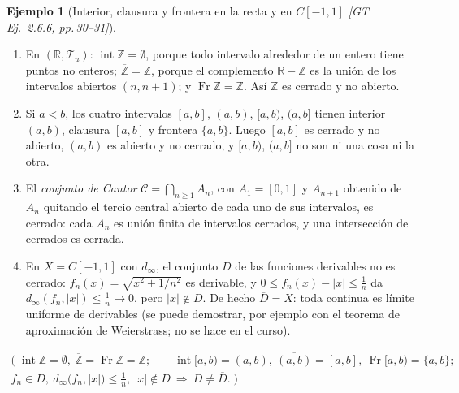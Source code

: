 \documentclass[11pt,a4paper]{article}
\newcommand{\lgc}[1]{\par\vspace{-3pt}\begin{gather*}\big(\;#1\;\big)\end{gather*}\vspace{-6pt}}
\newcommand{\figtit}[1]{\par\vspace{2pt}{\footnotesize\itshape #1}\par}
\theoremstyle{definition}
\newtheorem{ejemplo}[definicion]{Ejemplo}
\theoremstyle{plain}
\newcommand{\fnt}[1]{{\normalfont\small\itshape\color{gray!150!black}[#1]}}
\newcommand{\R}{\mathbb{R}}
\newcommand{\Z}{\mathbb{Z}}
\newcommand{\cl}[1]{\overline{#1}}
\newcommand{\intr}{\operatorname{int}}
\newcommand{\fr}{\operatorname{Fr}}
\newcommand{\tp}{\mathcal{T}}
\begin{document}
\begin{ejemplo}[{Interior, clausura y frontera en la recta y en $C[-1,1]$ \fnt{GT Ej.\ 2.6.6, pp.\,30--31}}]\label{hu:ejfr}
\leavevmode\begin{enumerate}[label=(\alph*),leftmargin=2.2em,itemsep=1pt]
\item En $(\R,\tp_u)$: $\intr\Z=\emptyset$, porque todo intervalo alrededor de un entero tiene puntos no enteros; $\cl\Z=\Z$, porque el complemento $\R-\Z$ es la unión de los intervalos abiertos $(n,n+1)$; y $\fr\Z=\Z$. Así $\Z$ es cerrado y no abierto.
\item Si $a<b$, los cuatro intervalos $[a,b]$, $(a,b)$, $[a,b)$, $(a,b]$ tienen interior $(a,b)$, clausura $[a,b]$ y frontera $\{a,b\}$. Luego $[a,b]$ es cerrado y no abierto, $(a,b)$ es abierto y no cerrado, y $[a,b)$, $(a,b]$ no son ni una cosa ni la otra.
\item El \emph{conjunto de Cantor} $\mathcal C=\bigcap_{n\ge1}A_n$, con $A_1=[0,1]$ y $A_{n+1}$ obtenido de $A_n$ quitando el tercio central abierto de cada uno de sus intervalos, es cerrado: cada $A_n$ es unión finita de intervalos cerrados, y una intersección de cerrados es cerrada.
\item En $X=C[-1,1]$ con $d_\infty$, el conjunto $D$ de las funciones derivables no es cerrado: $f_n(x)=\sqrt{x^2+1/n^2}$ es derivable, y $0\le f_n(x)-|x|\le\frac1n$ da $d_\infty(f_n,|x|)\le\frac1n\to0$, pero $|x|\notin D$. De hecho $\cl D=X$: toda continua es límite uniforme de derivables (se puede demostrar, por ejemplo con el teorema de aproximación de Weierstrass; no se hace en el curso).
\end{enumerate}
\lgc{\intr\Z=\emptyset,\ \cl\Z=\fr\Z=\Z;\qquad \intr[a,b)=(a,b),\ \cl{(a,b)}=[a,b],\ \fr[a,b)=\{a,b\};\\
f_n\in D,\ d_\infty\big(f_n,|x|\big)\le\tfrac1n,\ |x|\notin D\ \Rightarrow\ D\ne\cl D.}
\end{ejemplo}

\begin{figure}[ht]
\centering
{}
\figtit{Figura 5. Las primeras etapas del conjunto de Cantor. Cada $A_n$ es unión finita de intervalos cerrados; $\mathcal C$ es lo que sobrevive a todas las etapas.}
\end{figure}
\end{document}
